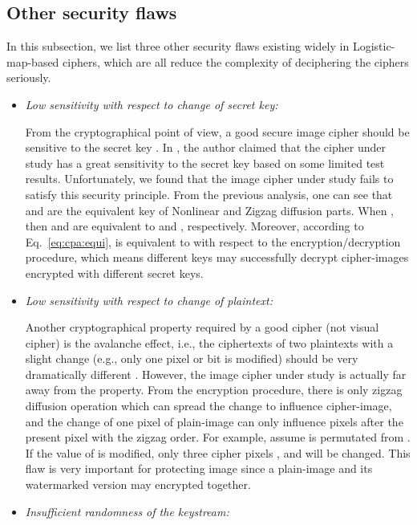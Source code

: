 \documentclass{ws-ijbc}
\begin{document}
\subsection{Other security flaws}

In this subsection, we list three other security flaws existing widely in Logistic-map-based ciphers, which
are all reduce the complexity of deciphering the ciphers seriously.
\begin{itemize}
\item \textit{Low sensitivity with respect to change of secret key:}

From the cryptographical point of view, a good secure image cipher should be sensitive to the secret key \cite{Schneier:Applied:2007}.
In \cite[Sec.~4.3]{Sam:TLM:MTA2012}, the author claimed that
the cipher under study has a great sensitivity to the secret key
based on some limited test results. Unfortunately, we found that
the image cipher under study fails to satisfy this security principle.
From the previous analysis, one can see that
 and
 are the
equivalent key of Nonlinear and Zigzag diffusion parts. When
,
then  and  are equivalent to  and
, respectively. Moreover, according to Eq.~\eqref{eq:cpa:equi},
 is equivalent
to 
with respect to the encryption/decryption procedure, which means different keys
may successfully decrypt cipher-images encrypted with different secret keys.

\item \textit{Low sensitivity with respect to change of plaintext:}

Another cryptographical property required by a good
cipher (not visual cipher) is the avalanche effect, i.e., the ciphertexts
of two plaintexts with a slight change (e.g., only one pixel or bit is modified)
should be very dramatically different \cite{Schneier:Applied:2007}.
However, the image cipher under study is actually far away
from the property. From the encryption procedure,
there is only zigzag diffusion operation which can spread
the change to influence cipher-image,
and the change of one pixel of plain-image can only influence
pixels after the present pixel with the zigzag order.
For example, assume  is permutated from .
If the value of  is modified, only three cipher pixels
,  and  will be changed. This flaw is very important for
protecting image since a plain-image and its watermarked version may encrypted together.

\item \textit{Insufficient randomness of the keystream:}


\end{itemize}
\end{document}
